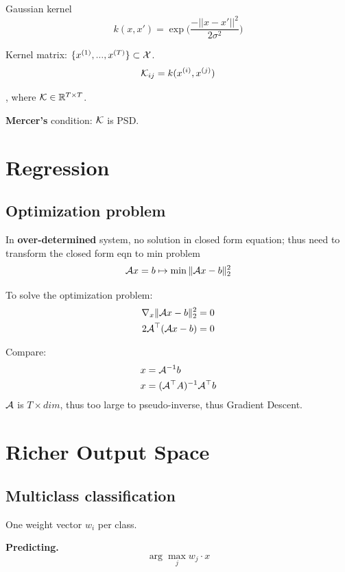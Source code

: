 \documentclass[a4paper]{report}
\begin{document}
Gaussian kernel
$$
k(x, x') = \exp\Bigg(\frac{-||x-x'||^2}{2\sigma^2}\Bigg)
$$


Kernel matrix: $\{x^{(1)},...,x^{(T)}\}\subset \mathcal{X}$. 
$$
\mathcal{K}_{ij} = k(x^{(i)}, x^{(j)}) 
$$

, where $\mathcal{K}\in \mathbb{R}^{T\times T}$.

\textbf{Mercer's} condition: $\mathcal{K}$ is PSD.
\chapter{Regression}
\section{Optimization problem}
In \textbf{over-determined} system, no solution in closed form equation; thus need to transform the closed form eqn to min problem
$$
\mathcal{A}x=b \mapsto \min \|\mathcal{A}x-b\|_2^2
$$

To solve the optimization problem:
\begin{align*}
\nabla_x \|\mathcal{A}x-b\|_2^2 &= 0 \\
2\mathcal{A}^\top(\mathcal{A}x-b) &= 0
\end{align*}

Compare:
\begin{align*}
x &= \mathcal{A}^{-1} b  \\
x &= (\mathcal{A}^\top A)^{-1}\mathcal{A}^\top b
\end{align*}
$\mathcal{A}$ is $T\times dim$, thus too large to pseudo-inverse, thus Gradient Descent.



\chapter{Richer Output Space} 
\section{Multiclass classification}
One weight vector $w_i$ per class. 

\textbf{Predicting.} 
$$
\arg\max_j w_j \cdot x
$$
\end{document}
